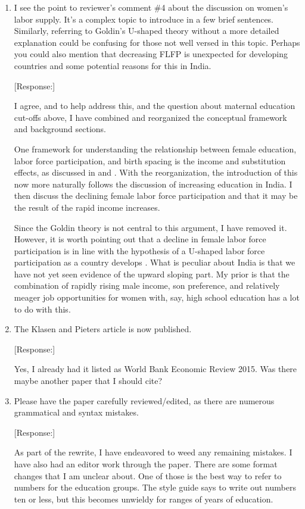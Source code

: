 \documentclass[letterpaper,12pt]{article}
\begin{document}
\begin{enumerate}
[Response:]

I have added a brief synopsis of the changes in India at the beginning of the Conclusion. 
I recap the three questions after that. 
I have also edited the Conclusion to tie better with the questions.

\item I see the point to reviewer’s comment \#4 about the discussion on
women’s labor supply. It’s a complex topic to introduce in a few brief
sentences. Similarly, referring to Goldin’s U-shaped theory without a
more detailed explanation could be confusing for those not well versed
in this topic. Perhaps you could also mention that decreasing FLFP is
unexpected for developing countries and some potential reasons for this
in India.

[Response:]

I agree, and to help address this, and the question about maternal education cut-offs
above, I have combined and reorganized the conceptual framework and background sections.

One framework for understanding the relationship between female education, labor force 
participation, and birth spacing is the income and substitution effects, as  discussed 
in \citet{Hotz1997} and \citet{schultz97}.
With the reorganization, the introduction of this now more naturally follows the discussion 
of increasing education in India. 
I then discuss the declining female labor force participation and that it may be the 
result of the rapid income increases.

Since the Goldin theory is not central to this argument, I have removed it.
However, it is worth pointing out that a decline in female labor force participation  
is in line with the hypothesis of a U-shaped labor force participation as a country 
develops \citep{Goldin1994}.
What is peculiar about India is that we have not yet seen evidence of the upward 
sloping part.
My prior is that the combination of rapidly rising male income, son preference, and relatively 
meager job opportunities for women with, say, high school education has a lot to do with this.



\item The Klasen and Pieters article is now published.

[Response:]

Yes, I already had it listed as World Bank Economic Review 2015.
Was there maybe another paper that I should cite?

\item Please have the paper carefully reviewed/edited, as there are
numerous grammatical and syntax mistakes.

[Response:]

As part of the rewrite, I have endeavored to weed any remaining mistakes. 
I have also had an editor work through the paper.
There are some format changes that I am unclear about. 
One of those is the best way to refer to numbers for the education groups. 
The style guide says to write out numbers ten or less, but this becomes 
unwieldy for ranges of years of education.


\end{enumerate}
\end{document}
